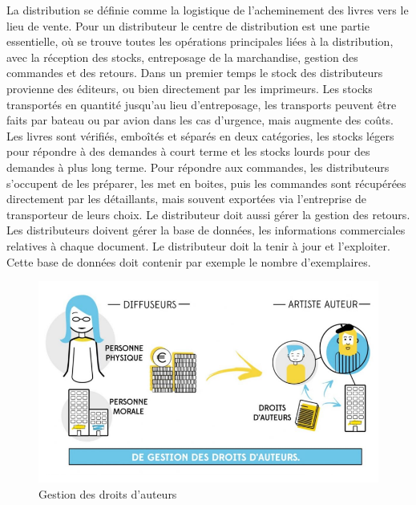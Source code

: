 \documentclass[a4paper, 13pt]{article}
\begin{document}
La distribution se définie comme la logistique de l'acheminement des livres vers le lieu de vente.
Pour un distributeur le centre de distribution est une partie essentielle, où se trouve toutes les opérations principales liées à la distribution, avec la réception des stocks, entreposage de la marchandise, gestion des commandes et des retours.
Dans un premier temps le stock des distributeurs provienne des éditeurs, ou bien directement par les imprimeurs. Les stocks transportés en quantité jusqu'au lieu d'entreposage, les transports peuvent être faits par bateau ou par avion dans les cas d'urgence, mais augmente des coûts.
Les livres sont vérifiés, emboîtés et séparés en deux catégories, les stocks légers pour répondre à des demandes à court terme et les stocks lourds pour des demandes à plus long terme.
Pour répondre aux commandes, les distributeurs s'occupent de les préparer, les met en boites, puis les commandes sont récupérées directement par les détaillants, mais souvent exportées via l'entreprise de transporteur de leurs choix. Le distributeur doit aussi gérer la gestion des retours.
Les distributeurs doivent gérer la base de données, les informations commerciales relatives à chaque document. Le distributeur doit la tenir à jour et l’exploiter. Cette base de données doit contenir par exemple le nombre d'exemplaires.
\begin{figure}[h]
    \centering
    \includegraphics[width=0.8\linewidth]{images/DroitsAuteur.png}
    \caption{Gestion des droits d'auteurs}
\end{figure}
\end{document}
